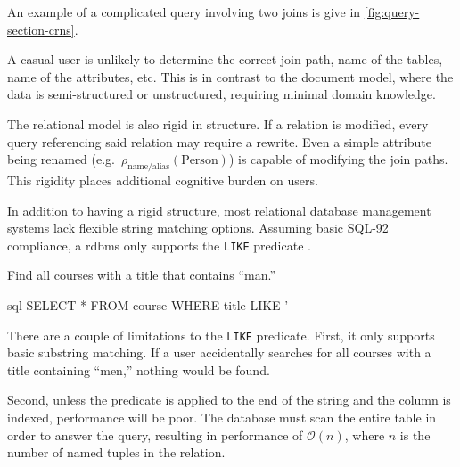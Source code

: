 			An example of a complicated query involving two joins is give in \vref{fig:query-section-crns}.
			
			A casual user is unlikely to determine the correct join path, name of the tables, name of the attributes, etc.	This is in contrast to the document model, where the data is semi-structured or unstructured, requiring minimal domain knowledge.

			The relational model is also rigid in structure.  If a relation is modified, every query referencing said relation may require a rewrite.  Even a simple attribute being renamed (e.g.~\(\rho_{\text{name/alias}}(\text{Person})\)) is capable of modifying the join paths.  This rigidity places additional cognitive burden on users.
			
			In addition to having a rigid structure, most relational database management systems lack flexible string matching options.	 Assuming basic SQL-92 compliance, a \gls{rdbms} only supports the \texttt{LIKE} predicate \cite{sql-2011}.
			
			\begin{ex}
				Find all courses with a title that contains ``man.''
				
				\begin{singlespaced}
					\begin{pygments}{sql}
SELECT *
FROM   course
WHERE  title LIKE '%
					\end{pygments}
				\end{singlespaced}
			\end{ex}
			
			There are a couple of limitations to the \texttt{LIKE} predicate.  First, it only supports basic substring matching.  If a user accidentally searches for all courses with a title containing ``men,'' nothing would be found.
			
			Second, unless the predicate is applied to the end of the string and the column is indexed, performance will be poor.  The database must scan the entire table in order to answer the query, resulting in performance of \(\mathcal{O}(n)\), where \(n\) is the number of named tuples in the relation.